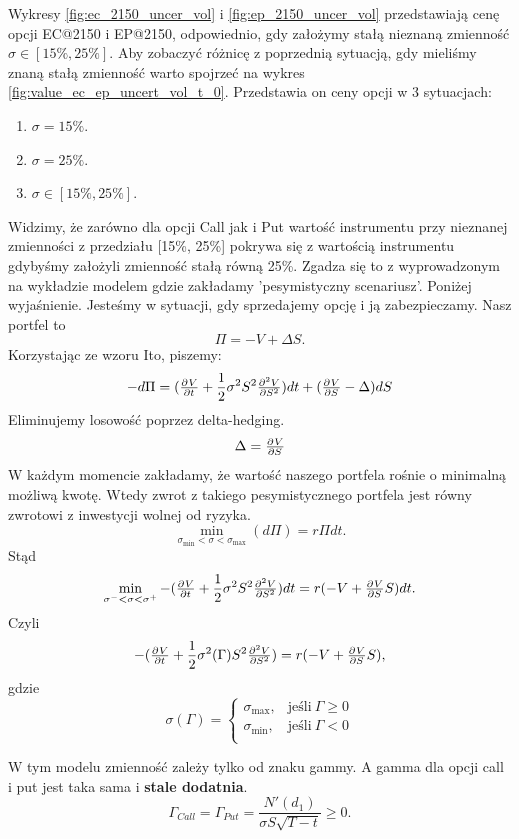 \documentclass[12pt]{article}
\providecommand{\pd}[3][]{\ensuremath{
\ifinner
\tfrac{\partial{^{#1}}#2}{\partial{#3^{#1}}}
\else
\dfrac{\partial{^{#1}}#2}{\partial{#3^{#1}}}
\fi
}}
\begin{document}
Wykresy \ref{fig:ec_2150_uncer_vol} i \ref{fig:ep_2150_uncer_vol} przedstawiają cenę opcji EC@2150  i EP@2150, odpowiednio, gdy założymy stałą nieznaną zmienność $\sigma \in [15\%, 25\%].$ Aby zobaczyć różnicę z poprzednią sytuacją, gdy mieliśmy znaną stałą zmienność warto spojrzeć na wykres \ref{fig:value_ec_ep_uncert_vol_t_0}. Przedstawia on ceny opcji w 3 sytuacjach:
\begin{enumerate}
    \item $\sigma = 15\%.$
    \item $\sigma = 25\%.$
    \item $\sigma \in [15\%, 25\%].$
\end{enumerate}
Widzimy, że zarówno dla opcji Call jak i Put wartość instrumentu przy nieznanej zmienności z przedziału [15\%, 25\%] pokrywa się z wartością instrumentu gdybyśmy założyli zmienność stałą równą  25\%. Zgadza się to z wyprowadzonym na wykładzie modelem gdzie zakładamy 'pesymistyczny scenariusz'. Poniżej wyjaśnienie.   Jesteśmy w sytuacji, gdy sprzedajemy opcję i ją zabezpieczamy. Nasz portfel to 
$$
    \Pi = -V + \Delta S.
$$
Korzystając ze wzoru Ito, piszemy:
$$
- d\Pi = (\pd{V}{t} + \frac{1}{2}\sigma^2S^2 \pd[2]{V}{S})dt + (\pd{V}{S} -\Delta) dS
$$
Eliminujemy losowość poprzez delta-hedging. 
$$
\Delta = \pd{V}{S}
$$
W każdym momencie zakładamy, że wartość naszego portfela rośnie o minimalną możliwą kwotę. Wtedy zwrot z takiego pesymistycznego portfela jest równy zwrotowi z inwestycji wolnej od ryzyka.
$$
\min_{\sigma_{\min} < \sigma < \sigma_{\max} } (d \Pi) = r \Pi dt.
$$
Stąd
$$
\min_{\sigma^- < \sigma < \sigma^+ } -(\pd{V}{t} + \frac{1}{2}\sigma^2S^2 \pd[2]{V}{S})dt  = r (-V + \pd{V}{S} S) dt.
$$
Czyli 
$$
 -(\pd{V}{t} + \frac{1}{2}\sigma^2(\Gamma)S^2 \pd[2]{V}{S}) =r (-V + \pd{V}{S} S),  
$$
gdzie 
\begin{equation*}
    \sigma(\Gamma) = 
    \begin{cases} 
        \sigma_{\max}, & \text{jeśli}\ \Gamma \geq 0 \\
        \sigma_{\min}, & \text{jeśli}\ \Gamma < 0 \\
    \end{cases}
\end{equation*}
    
W tym modelu zmienność zależy tylko od znaku gammy. A gamma dla opcji call i put jest taka sama i \textbf{stale dodatnia}.
$$
\Gamma_{Call} = \Gamma_{Put} = \frac{N'(d_1)}{\sigma S \sqrt{T-t}} \geq 0.
$$
\end{document}
